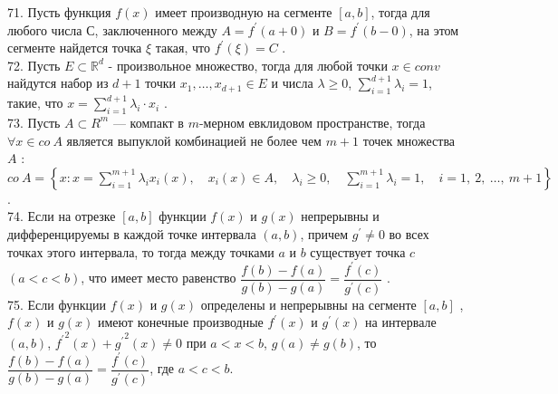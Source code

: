 \documentclass[12pt]{article}
\begin{document}
{71. Пусть функция ${\displaystyle f(x)}$ имеет производную на сегменте ${\displaystyle [a,b]}$, тогда для любого числа ${\displaystyle С}$, заключенного между ${\displaystyle A=f^{\prime}(a+0)}$ и ${\displaystyle B=f^{\prime}(b-0)}$, на этом сегменте найдется точка ${\displaystyle \xi}$ такая, что ${\displaystyle f^{\prime}(\xi)=C}$ .\\

72. Пусть ${\displaystyle E \subset \mathbb{R}^d}$ - произвольное множество, тогда для любой точки ${\displaystyle x \in conv}$ найдутся набор из ${\displaystyle d+1}$ точки ${\displaystyle x_1,\ldots,x_{d+1} \in E}$ и числа ${\displaystyle \lambda \geq 0}$, ${\sum \limits _{i=1}^{d+1} \lambda_i=1}$, такие, что ${\displaystyle  x=\sum \limits _{i=1}^{d+1} \lambda_i\cdot x_i}$ .\\

73. Пусть ${\displaystyle A\subset R^{m}}$  — компакт в ${\displaystyle m}$-мерном евклидовом пространстве, тогда ${\displaystyle \forall x\in co\ A}$ является выпуклой комбинацией не более чем ${\displaystyle m + 1}$ точек множества ${\displaystyle A}$ : ${\displaystyle co\ A=\left\{x:x=\sum _{i=1}^{m+1}\lambda _{i}x_{i}(x),\quad x_{i}(x)\in A,\quad \lambda _{i}\geqslant 0,\quad \sum _{i=1}^{m+1}\lambda _{i}=1,\quad i=1,\ 2,\ \dots ,\ m+1\right\}}$ .\\

74. Если на отрезке ${\displaystyle [a,b]}$ функции ${\displaystyle f(x)}$ и ${\displaystyle g(x)}$ непрерывны и дифференцируемы в каждой точке интервала ${\displaystyle (a,b)}$, причем  ${\displaystyle g^{\prime}\neq 0}$ во всех точках этого интервала, то тогда между точками ${\displaystyle a}$ и  ${\displaystyle b}$ существует точка ${\displaystyle c}$ ${\displaystyle (a<c<b)}$, что имеет место равенство ${\displaystyle \dfrac{f(b)-f(a)}{g(b)-g(a)}=\dfrac{f^{\prime}(c)}{g^{\prime}(c)}}$ .\\

75. Если функции ${\displaystyle f(x)}$ и ${\displaystyle g(x)}$ определены и непрерывны на сегменте ${\displaystyle [a,b]}$ , ${\displaystyle f(x)}$ и ${\displaystyle g(x)}$ имеют конечные производные ${\displaystyle f^{\prime}(x)}$  и ${\displaystyle g^{\prime}(x)}$ на интервале ${\displaystyle (a,b)}$, ${\displaystyle {f^{\prime}}^2(x)+{g^{\prime}}^2(x) \neq 0}$ при ${\displaystyle a<x<b}$, ${\displaystyle g(a)\neq g(b)}$, то ${\displaystyle \dfrac{f(b)-f(a)}{g(b)-g(a)}=\dfrac{f^{\prime}(c)}{g^{\prime}(c)}}$, где ${\displaystyle a<c<b}$.\\

}
\end{document}
